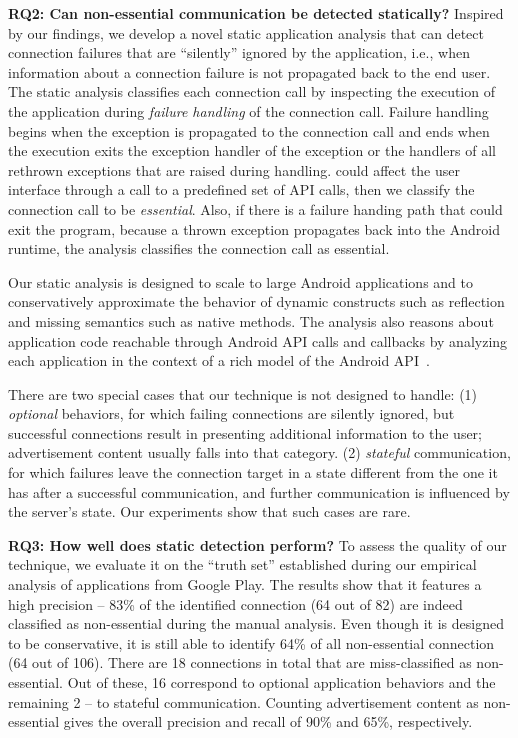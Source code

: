 \vspace{0.1in}
\noindent 
{\bf RQ2: Can non-essential communication be detected statically?}
Inspired by our findings, we develop a novel static application
analysis that can detect connection failures that are ``silently''
ignored by the application, i.e., when information about a connection
failure is not propagated back to the end user.  The static analysis
classifies each connection call by inspecting the execution of the
application during {\it failure handling} of the connection call.
Failure handling begins when the exception is propagated to the
connection call and ends when the execution exits the exception
handler of the exception or the handlers of all rethrown exceptions
that are raised during handling.  could affect the user interface
through a call to a predefined set of API calls, then we classify the
connection call to be {\em essential}.  Also, if there is a failure handing
path that could exit the program, because a thrown exception
propagates back into the Android runtime, the analysis classifies the
connection call as essential.

Our static analysis is designed to scale to large Android applications
and to conservatively approximate the behavior of dynamic constructs
such as reflection and missing semantics such as native methods.  The
analysis also reasons about application code reachable through Android
API calls and callbacks by analyzing each application in the context
of a rich model of the Android
API~\cite{Gordon:Kim:Perkins:Gilham:Nguyen:Rinard:NDSS15}. 

There are two special cases that our technique is not designed to handle: (1) \emph{optional} behaviors, for which failing connections are silently ignored, but successful connections result in presenting additional information to the user; 
advertisement content usually falls into that category. (2) \emph{stateful} communication, for which failures leave the 
connection target in a state different from the one it has after a successful communication, and further communication is influenced by the server's state. Our experiments show that such cases are rare. 

\vspace{0.1in}
\noindent 
{\bf RQ3: How well does static detection perform?}
To assess the quality of our technique, we evaluate it on the ``truth set'' established during our empirical analysis of applications from Google Play.
The results show that it features a high precision -- 83\% of the identified connection (64 out of 82) are indeed classified as non-essential during the manual analysis. Even though it is designed to be conservative, it is still able to identify  64\% of all non-essential connection (64 out of 106).
There are 18 connections in total that are miss-classified as non-essential. Out of these, 16 correspond to optional application behaviors and the remaining 2 -- to stateful communication. Counting advertisement content as non-essential
gives the overall precision and recall of 90\% and 65\%, respectively.  


